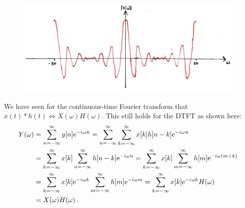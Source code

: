 %
\begin{figure}[H]
  \includegraphics[width=\textwidth]{images/lecture_7_periodic_sinc.JPG}
  \caption{
  }
  \label{fig::lecture_7_periodic_sinc}
\end{figure}
%
We have seen for the continuous-time Fourier transform that
$x(t) * h(t) \Longleftrightarrow X(\omega)H(\omega)$. This still holds for the DTFT
as shown here:
%
\begin{align*}
  Y(\omega) &= \sum_{n=-\infty}^\infty y[n]\mathrm{e}^{-{i\mkern1mu}\omega n} = \sum_{n=-\infty}^\infty\sum_{k=-\infty}^\infty x[k]h[n-k]\mathrm{e}^{-{i\mkern1mu}\omega n} \\
  &= \sum_{k=-\infty}^\infty x[k]\sum_{n=-\infty}^\infty h[n-k]\mathrm{e}^{-{i\mkern1mu}\omega n} = \sum_{k=-\infty}^\infty x[k]\sum_{m=-\infty}^\infty h[m]\mathrm{e}^{-{i\mkern1mu}\omega(m + k)} \\
  &= \sum_{k=-\infty}^\infty x[k]\mathrm{e}^{-{i\mkern1mu}\omega k}\sum_{m=-\infty}^\infty h[m]\mathrm{e}^{-{i\mkern1mu}\omega m} 
  = \sum_{k=-\infty}^\infty x[k]\mathrm{e}^{-{i\mkern1mu}\omega k} H(\omega) \\
  &= X(\omega)H(\omega) \,.
\end{align*}

